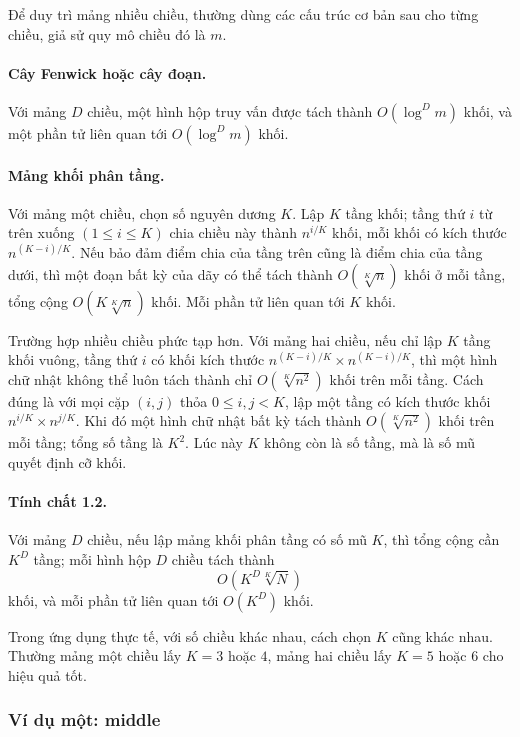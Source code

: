 \documentclass[11pt]{article}
\begin{document}
Để duy trì mảng nhiều chiều, thường dùng các cấu trúc cơ bản sau cho từng
chiều, giả sử quy mô chiều đó là \(m\).

\paragraph{Cây Fenwick hoặc cây đoạn.}
Với mảng \(D\) chiều, một hình hộp truy vấn được tách thành
\(O(\log^D m)\) khối, và một phần tử liên quan tới \(O(\log^D m)\) khối.

\paragraph{Mảng khối phân tầng.}
Với mảng một chiều, chọn số nguyên dương \(K\). Lập \(K\) tầng khối; tầng thứ
\(i\) từ trên xuống \((1\le i\le K)\) chia chiều này thành \(n^{i/K}\) khối,
mỗi khối có kích thước \(n^{(K-i)/K}\). Nếu bảo đảm điểm chia của tầng trên
cũng là điểm chia của tầng dưới, thì một đoạn bất kỳ của dãy có thể tách thành
\(O(\sqrt[K]{n})\) khối ở mỗi tầng, tổng cộng \(O(K\sqrt[K]{n})\) khối. Mỗi
phần tử liên quan tới \(K\) khối.

Trường hợp nhiều chiều phức tạp hơn. Với mảng hai chiều, nếu chỉ lập \(K\)
tầng khối vuông, tầng thứ \(i\) có khối kích thước
\(n^{(K-i)/K}\times n^{(K-i)/K}\), thì một hình chữ nhật không thể luôn tách
thành chỉ \(O(\sqrt[K]{n^2})\) khối trên mỗi tầng. Cách đúng là với mọi cặp
\((i,j)\) thỏa \(0\le i,j<K\), lập một tầng có kích thước khối
\(n^{i/K}\times n^{j/K}\). Khi đó một hình chữ nhật bất kỳ tách thành
\(O(\sqrt[K]{n^2})\) khối trên mỗi tầng; tổng số tầng là \(K^2\). Lúc này
\(K\) không còn là số tầng, mà là số mũ quyết định cỡ khối.

\paragraph{Tính chất 1.2.}
Với mảng \(D\) chiều, nếu lập mảng khối phân tầng có số mũ \(K\), thì tổng
cộng cần \(K^D\) tầng; mỗi hình hộp \(D\) chiều tách thành
\[
  O(K^D\sqrt[K]{N})
\]
khối, và mỗi phần tử liên quan tới \(O(K^D)\) khối.

Trong ứng dụng thực tế, với số chiều khác nhau, cách chọn \(K\) cũng khác
nhau. Thường mảng một chiều lấy \(K=3\) hoặc \(4\), mảng hai chiều lấy
\(K=5\) hoặc \(6\) cho hiệu quả tốt.

\subsubsection{Ví dụ một: middle}
\end{document}
